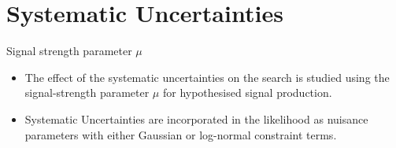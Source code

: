 \documentclass[10pt]{beamer} %
\begin{document}
\section{Systematic Uncertainties}


\begin{frame}{Signal strength parameter $\mu$}
    \begin{itemize}
        \item     The effect of the systematic uncertainties on the search is studied using the signal-strength parameter $\mu$ for hypothesised signal production.
        \item Systematic Uncertainties are incorporated in the likelihood as nuisance parameters with either Gaussian or log-normal constraint terms.
    \end{itemize}

\end{frame}
\end{document}
